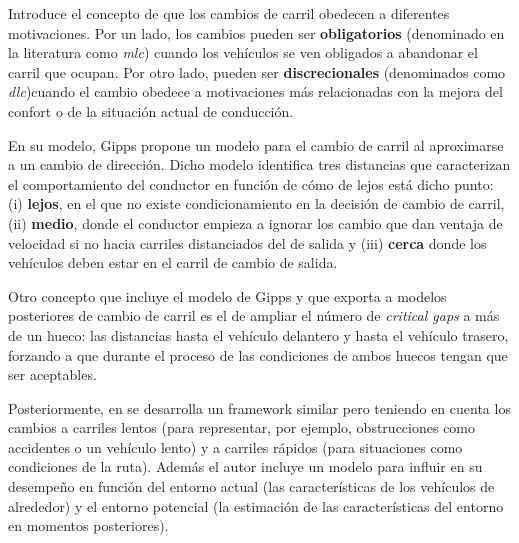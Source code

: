 Introduce el concepto de que los cambios de carril obedecen a diferentes motivaciones. Por un lado, los cambios pueden ser \textbf{obligatorios} (denominado en la literatura como \textit{\Acrfull{mlc}}) cuando los vehículos se ven obligados a abandonar el carril que ocupan. Por otro lado, pueden ser \textbf{discrecionales} (denominados como \textit{\Acrfull{dlc}})cuando el cambio obedece a motivaciones más relacionadas con la mejora del confort o de la situación actual de conducción.

En su modelo, Gipps propone un modelo para el cambio de carril al aproximarse a un cambio de dirección. Dicho modelo identifica tres distancias que caracterizan el comportamiento del conductor en función de cómo de lejos está dicho punto: (i) \textbf{lejos}, en el que no existe condicionamiento en la decisión de cambio de carril, (ii) \textbf{medio}, donde el conductor empieza a ignorar los cambio que dan ventaja de velocidad si no hacia carriles distanciados del de salida y (iii) \textbf{cerca} donde los vehículos deben estar en el carril de cambio de salida.

Otro concepto que incluye el modelo de Gipps y que exporta a modelos posteriores de cambio de carril es el de ampliar el número de \textit{critical gaps} a más de un hueco: las distancias hasta el vehículo delantero y hasta el vehículo trasero, forzando a que durante el proceso de \textit{} las condiciones de ambos huecos tengan que ser aceptables.

Posteriormente, en \cite{wiedemann1992microscopic} se desarrolla un framework similar pero teniendo en cuenta los cambios a carriles lentos (para representar, por ejemplo, obstrucciones como accidentes o un vehículo lento) y a carriles rápidos (para situaciones como condiciones de la ruta). Además el autor incluye un modelo para influir en su desempeño en función del entorno actual (las características de los vehículos de alrededor) y el entorno potencial (la estimación de las características del entorno en momentos posteriores).



